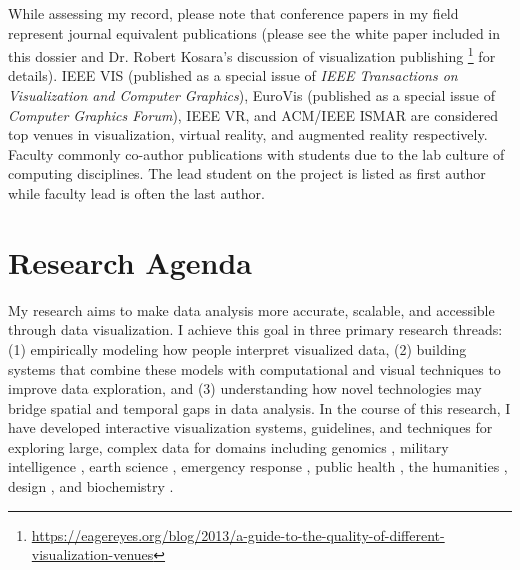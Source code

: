 \documentclass[11pt]{article}
\begin{document}
While assessing my record, please note that conference papers in my field represent journal equivalent publications (please see the white paper included in this dossier and Dr. Robert Kosara's discussion of visualization publishing \footnote{\url{https://eagereyes.org/blog/2013/a-guide-to-the-quality-of-different-visualization-venues}} for details). IEEE VIS (published as a special issue of \emph{IEEE Transactions on Visualization and Computer Graphics}), EuroVis (published as a special issue of \emph{Computer Graphics Forum}), IEEE VR, and ACM/IEEE ISMAR are considered top venues in visualization, virtual reality, and augmented reality respectively. Faculty commonly co-author publications with students due to the lab culture of computing disciplines. The lead student on the project is listed as first author while faculty lead is often the last author. 




\section*{Research Agenda}
My research aims to make data analysis more accurate, scalable, and accessible through data visualization. I achieve this goal in three primary research threads: (1) empirically modeling how people interpret visualized data, (2) building systems that combine these models with computational and visual techniques to improve data exploration, and (3) understanding how novel technologies may bridge spatial and temporal gaps in data analysis. In the course of this research, I have 
developed interactive visualization systems, guidelines, and techniques for exploring large, complex data for domains including genomics \cite{albers2011sequence}, military intelligence \cite{muesing2019}, earth science \cite{whitlock2019}, emergency response \cite{whitlock2019}, public health \cite{song2019}, the humanities \cite{szafir2016textdna}, design \cite{smart2019VIS}, and biochemistry \cite{sarikaya2014visualizing}. 
\end{document}
